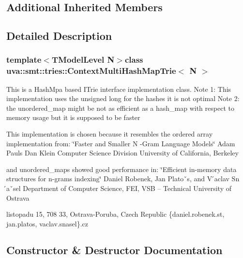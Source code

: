 \subsection*{Additional Inherited Members}


\subsection{Detailed Description}
\subsubsection*{template$<$T\+Model\+Level N$>$class uva\+::smt\+::tries\+::\+Context\+Multi\+Hash\+Map\+Trie$<$ N $>$}

This is a Hash\+Mpa based I\+Trie interface implementation class. Note 1\+: This implementation uses the unsigned long for the hashes it is not optimal Note 2\+: the unordered\+\_\+map might be not as efficient as a hash\+\_\+map with respect to memory usage but it is supposed to be faster

This implementation is chosen because it resembles the ordered array implementation from\+: \char`\"{}\+Faster and Smaller N -\/\+Gram Language Models\char`\"{} Adam Pauls Dan Klein Computer Science Division University of California, Berkeley

and unordered\+\_\+maps showed good performance in\+: \char`\"{}\+Efficient in-\/memory data structures for n-\/grams indexing\char`\"{} Daniel Robenek, Jan Platoˇs, and V ́aclav Sn ́aˇsel Department of Computer Science, F\+E\+I, V\+S\+B – Technical University of Ostrava
\begin{DoxyEnumerate}
\item listopadu 15, 708 33, Ostrava-\/\+Poruba, Czech Republic \{daniel.\+robenek.\+st, jan.\+platos, vaclav.\+snasel\}.cz 
\end{DoxyEnumerate}

\subsection{Constructor \& Destructor Documentation}
\hypertarget{classuva_1_1smt_1_1tries_1_1_context_multi_hash_map_trie_a4dedd355285be9d410d0cef0faf4e493}{}
